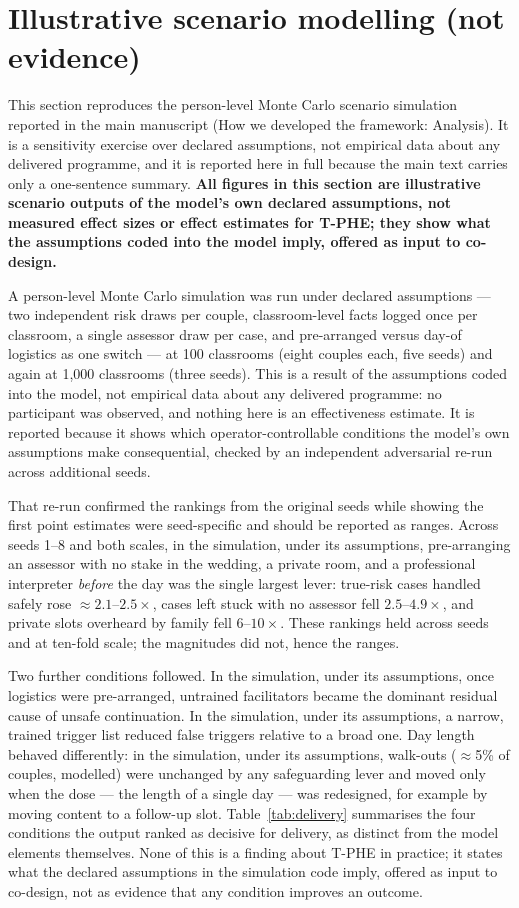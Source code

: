 \documentclass[11pt]{article}
\newcommand{\tphe}{T\mbox{-}PHE}
\begin{document}
\section{Illustrative scenario modelling (not evidence)}
\label{sec:S2}
\footnotesize
This section reproduces the person-level Monte Carlo scenario simulation reported in the main manuscript (How we developed the framework: Analysis). It is a sensitivity exercise over declared assumptions, not empirical data about any delivered programme, and it is reported here in full because the main text carries only a one-sentence summary. \textbf{All figures in this section are illustrative scenario outputs of the model's own declared assumptions, not measured effect sizes or effect estimates for \tphe{}; they show what the assumptions coded into the model imply, offered as input to co-design.}

A person-level Monte Carlo simulation was run under declared assumptions --- two independent risk
draws per couple, classroom-level facts logged once per classroom, a single assessor draw per case,
and pre-arranged versus day-of logistics as one switch --- at 100 classrooms (eight couples each, five
seeds) and again at 1,000 classrooms (three seeds). This is a result of the assumptions coded into
the model, not empirical data about any delivered programme: no participant was observed, and nothing
here is an effectiveness estimate. It is reported because it shows which operator-controllable
conditions the model's own assumptions make consequential, checked by an independent adversarial
re-run across additional seeds.

That re-run confirmed the rankings from the original seeds while showing the first point estimates
were seed-specific and should be reported as ranges. Across seeds 1--8 and both scales, in the
simulation, under its assumptions, pre-arranging an assessor with no stake in the wedding, a private
room, and a professional interpreter \emph{before} the day was the single largest lever: true-risk
cases handled safely rose $\approx\!2.1$--$2.5\times$, cases left stuck with no assessor fell
$2.5$--$4.9\times$, and private slots overheard by family fell $6$--$10\times$. These rankings held
across seeds and at ten-fold scale; the magnitudes did not, hence the ranges.

Two further conditions followed. In the simulation, under its assumptions, once logistics were
pre-arranged, untrained facilitators became the dominant residual cause of unsafe continuation. In the
simulation, under its assumptions, a narrow, trained trigger list reduced false triggers relative to a
broad one. Day length behaved differently: in the simulation, under its assumptions, walk-outs
($\approx$5\% of couples, modelled) were unchanged by any safeguarding lever and moved only when the
dose --- the length of a single day --- was redesigned, for example by moving content to a follow-up
slot. Table~\ref{tab:delivery} summarises the four conditions the output ranked as decisive for
delivery, as distinct from the model elements themselves. None of this is a finding about \tphe{} in
practice; it states what the declared assumptions in the simulation code imply, offered as input to
co-design, not as evidence that any condition improves an outcome.
\end{document}
